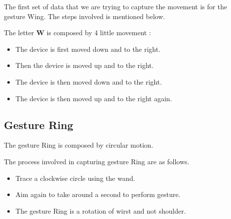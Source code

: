 The first set of data that we are trying to capture the movement is for the gesture Wing. The steps involved  is mentioned below.

\begin{center}
\end{center}


The letter \textbf{W} is composed by 4 little movement : 

\begin{itemize}
    \item The device is first moved down and to the right.
    \item Then the device is moved up and to the right.
    \item The device is then moved down and to the right.
    \item  The device is then moved up and to the right again. 
\end{itemize}


\subsection{Gesture Ring}

The gesture Ring is composed by circular motion.  

\begin{center}
    
\end{center}
The process involved in capturing gesture Ring are as follows.
\begin{itemize}
    \item Trace a clockwise circle using the wand.
    \item Aim again to take around a second to perform gesture.	
    \item The gesture Ring is a rotation of wirst and not shoulder.
\end{itemize}


